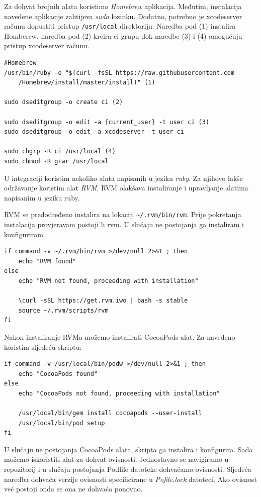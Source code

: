\documentclass[times, utf8, diplomski, numeric]{fer}
\begin{document}
\begin{appendices}
Za dohvat brojnih alata koristimo \textit{Homebrew} aplikacija. Međutim, instalacija navedene aplikacije zahtijeva \textit{sudo} lozinku. Dodatno, potrebno je xcodeserver računu dopustiti pristup \verb|/usr/local| direktoriju. Naredba pod (1) instalira Homberew, naredba pod (2) kreira ci grupu dok naredbe (3) i (4) omogućuju pristup xcodeserver računu.

\begin{verbatim}
#Homebrew
/usr/bin/ruby -e "$(curl -fsSL https://raw.githubusercontent.com
    /Homebrew/install/master/install)" (1)

sudo dseditgroup -o create ci (2)

sudo dseditgroup -o edit -a {current_user} -t user ci (3)
sudo dseditgroup -o edit -a xcodeserver -t user ci

sudo chgrp -R ci /usr/local (4)
sudo chmod -R g+wr /usr/local

\end{verbatim}

U integraciji koristim nekoliko alata napisanih u jeziku \textit{ruby}. Za njihovo lakše održavanje koristim alat \textit{RVM}. RVM olakšava instaliranje i upravljanje alatima napisanim u jeziku ruby.

RVM se predodređeno instalira na lokaciji \verb|~/.rvm/bin/rvm|. Prije pokretanja instalacija provjeravam postoji li rvm. U slučaju ne postojanja ga instaliram i konfiguriram.

\begin{verbatim}
if command -v ~/.rvm/bin/rvm >/dev/null 2>&1 ; then
    echo "RVM found"
else
    echo "RVM not found, proceeding with installation"

    \curl -sSL https://get.rvm.iwo | bash -s stable
    source ~/.rvm/scripts/rvm
fi
\end{verbatim}

Nakon instaliranje RVMa možemo instalirati CocoaPods alat. Za navedeno koristim sljedeću skriptu:

\begin{verbatim}
if command -v /usr/local/bin/podw >/dev/null 2>&1 ; then
    echo "CocoaPods found"
else
    echo "CocoaPods not found, proceeding with installation"

    /usr/local/bin/gem install cocoapods --user-install
    /usr/local/bin/pod setup
fi
\end{verbatim}

U slučaju ne postojanja CocoaPods alata, skripta ga instalira i konfigurira. Sada možemo iskoristiti alat za dohvat ovisnosti. Jednostavno se navigiramo u repozitorij i u slučaju postojanja Podfile datoteke dohvaćamo ovisnosti. Sljedeća naredba dohvaća verzije ovisnosti specificirane u \textit{Pofile.lock} datoteci. Ako ovisnost već postoji onda se ona ne dohvaća ponovno.


\end{appendices}
\end{document}
